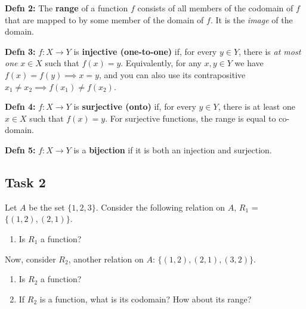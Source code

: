 \documentclass[12pt,letterpaper]{article}
\begin{document}
      \textbf{Defn 2:} The \textbf{range} of a function $f$ consists of all members of the codomain of $f$ that are mapped to by some member of the domain of $f$. It is the \emph{image} of the domain.

      \textbf{Defn 3:} $f : X \rightarrow Y$ is \textbf{injective (one-to-one)}  if, for every $y \in Y$, there is \textit{at most one} $x \in X$ such that $f(x) = y$. Equivalently, for any $x,y\in Y$ we have $ f(x) = f(y)\implies x=y$, and you can also use its contrapositive $x_1 \not= x_2 \implies f(x_1) \not= f(x_2)$.

      \textbf{Defn 4:} $f : X \rightarrow Y$ is \textbf{surjective (onto)} if, for every $y \in Y$, there is at least one $x \in X$ such that $f(x) = y$. For surjective functions, the range is equal to co-domain.

      \textbf{Defn 5:} $f : X \rightarrow Y$ is a \textbf{bijection} if it is both an injection and surjection. 

      \subsection*{Task 2}
      
      Let $A$ be the set $\{1, 2, 3\}$. Consider the following relation on $A$, $R_1$ = $\{(1, 2), (2, 1)\}$. 

      \begin{enumerate}[1.]
      \item Is $R_1$ a function? 
      \begin{mdframed} \vspace{1cm} \end{mdframed}
      \end{enumerate}

      Now, consider $R_2$, another relation on $A$:  $\{(1, 2), (2, 1), (3, 2)\}$. 
      \begin{enumerate}[1.]
      \item Is $R_2$ a function? 
      \begin{mdframed} \vspace{1cm} \end{mdframed}
      \item If $R_2$ is a function, what is its codomain? How about its range?
       \begin{mdframed} \vspace{1cm} \end{mdframed}
      \end{enumerate}
\end{document}

